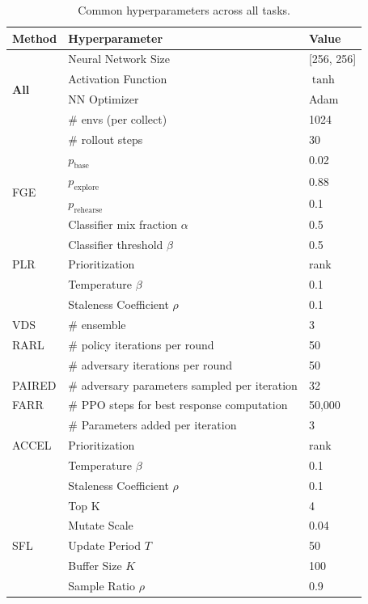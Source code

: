 \documentclass{article} %
\newcommand{\AlgOursAbrv}{FGE}
\newcommand{\AlgOurs}{\textcolor{MaterialBlue900}{\small\textsf{\AlgOursAbrv{}}}}
\newcommand{\AlgRARL}{\textcolor{MaterialPurple900}{\small\textsf{RARL}}}
\newcommand{\AlgPLR}{\textcolor{MaterialPurple900}{\small\textsf{PLR}}}
\newcommand{\AlgVDS}{\textcolor{MaterialPurple900}{\small\textsf{VDS}}}
\newcommand{\AlgACCEL}{\textcolor{MaterialPurple900}{\small\textsf{ACCEL}}}
\newcommand{\AlgPAIRED}{\textcolor{MaterialPurple900}{\small\textsf{PAIRED}}}
\newcommand{\AlgFARR}{\textcolor{MaterialPurple900}{\small\textsf{FARR}}}
\newcommand{\AlgSFL}{\textcolor{MaterialPurple900}{\small\textsf{SFL}}}
\begin{document}
\begin{table}
\centering
\caption{Common hyperparameters across all tasks.}
\label{tab:common_hyperparam}
\renewcommand{\arraystretch}{1.2}
\begin{tabular}{lll}
    \toprule
    \textbf{Method} & \textbf{Hyperparameter} & \textbf{Value} \\
    \midrule
    \multirow{4}{*}{\textbf{All}} 
        & Neural Network Size & [256, 256] \\
        & Activation Function & $\tanh$ \\
        & NN Optimizer & Adam \\
        & \# envs (per collect) & 1024 \\ 
        & \# rollout steps & 30 \\
    \midrule
    \multirow{4}{*}{\AlgOurs{}}
        & $p_{\text{base}}$ & 0.02 \\
        & $p_{\text{explore}}$ & 0.88 \\
        & $p_{\text{rehearse}}$ & 0.1 \\
        & Classifier mix fraction $\alpha$ & 0.5 \\
        &Classifier threshold $\beta$ & 0.5 \\
    \midrule
    \multirow{1}{*}{\AlgPLR{}} 
        & Prioritization & rank \\
        & Temperature $\beta$ & 0.1 \\
        & Staleness Coefficient $\rho$ & 0.1 \\
    \midrule
    \multirow{1}{*}{\AlgVDS{}} 
        & \# ensemble & 3 \\
    \midrule
    \multirow{1}{*}{\AlgRARL{}} 
        & \# policy iterations per round & 50 \\
        & \# adversary iterations per round & 50 \\
    \midrule
    \multirow{1}{*}{\AlgPAIRED{}} 
        & \# adversary parameters sampled per iteration & 32 \\
    \midrule
    \multirow{1}{*}{\AlgFARR{}} 
        & \# PPO steps for best response computation & 50,000 \\
        & \# Parameters added per iteration & 3 \\
    \midrule
    \multirow{1}{*}{\AlgACCEL{}} 
        & Prioritization & rank \\
        & Temperature $\beta$ & 0.1 \\
        & Staleness Coefficient $\rho$ & 0.1 \\
        & Top K & 4 \\
        & Mutate Scale & 0.04 \\
    \midrule
    \multirow{1}{*}{\AlgSFL{}} 
        & Update Period $T$ & 50 \\
        & Buffer Size $K$ & 100 \\
        & Sample Ratio $\rho$ & 0.9 \\
    \bottomrule
\end{tabular}
\end{table}
\end{document}
